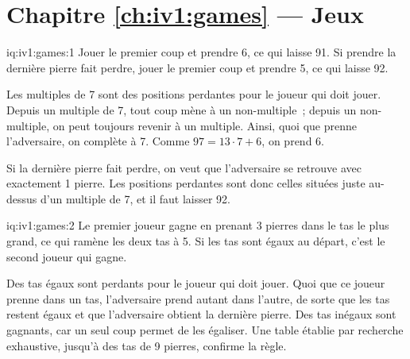 \section*{Chapitre \ref{ch:iv1:games} --- Jeux}

\begin{solution}{iq:iv1:games:1}
Jouer le premier coup et prendre 6, ce qui laisse 91. Si prendre la dernière pierre fait perdre, jouer le premier coup et prendre 5, ce qui laisse 92.

Les multiples de 7 sont des positions perdantes pour le joueur qui doit jouer. Depuis un multiple de 7, tout coup mène à un non-multiple~; depuis un non-multiple, on peut toujours revenir à un multiple. Ainsi, quoi que prenne l'adversaire, on complète à 7. Comme $97 = 13 \cdot 7 + 6$, on prend 6.

Si la dernière pierre fait perdre, on veut que l'adversaire se retrouve avec exactement 1 pierre. Les positions perdantes sont donc celles situées juste au-dessus d'un multiple de 7, et il faut laisser 92.

\end{solution}

\begin{solution}{iq:iv1:games:2}
Le premier joueur gagne en prenant 3 pierres dans le tas le plus grand, ce qui ramène les deux tas à 5. Si les tas sont égaux au départ, c'est le second joueur qui gagne.

Des tas égaux sont perdants pour le joueur qui doit jouer. Quoi que ce joueur prenne dans un tas, l'adversaire prend autant dans l'autre, de sorte que les tas restent égaux et que l'adversaire obtient la dernière pierre. Des tas inégaux sont gagnants, car un seul coup permet de les égaliser. Une table établie par recherche exhaustive, jusqu'à des tas de 9 pierres, confirme la règle.

\end{solution}


